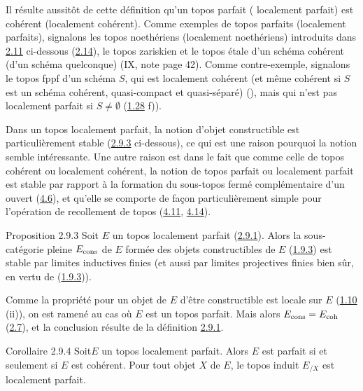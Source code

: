 \documentclass[10pt]{../fichiers-configuration-latex/smfart}
\begin{document}
Il résulte aussitôt de cette définition qu'un topos parfait (\resp
localement parfait) est cohérent (\resp localement cohérent). Comme
exemples de topos parfaits (\resp localement parfaits), signalons
les topos noethériens (\resp localement noethériens) introduits dans
\hyperref[VI.def2.11]{2.11} ci-dessous (\cf \hyperref[VI.subsec2.14]{2.14}), le topos
zariskien et le topos étale d'un schéma cohérent (\resp d'un schéma
quelconque) (IX, note page 42). Comme contre-exemple,\pageoriginale
signalons le topos fppf d'un schéma $S$, qui est localement cohérent
(et même cohérent si $S$ est un schéma cohérent, \ie quasi-compact
et quasi-séparé) (), mais qui n'est pas localement
parfait si $S \neq ∅$ (\hyperref[VI.exer1.28]{1.28} f)).

Dans un topos localement parfait, la notion d'objet constructible
est particulièrement stable (\hyperref[VI.prop2.9.3]{2.9.3} ci-dessous), ce qui
est une raison pourquoi la notion semble intéressante. Une autre
raison est dans le fait que comme celle de topos cohérent ou
localement cohérent, la notion de topos parfait ou localement
parfait est stable par rapport à la formation du sous-topos fermé
complémentaire d'un ouvert (\hyperref[VI.prop4.6]{4.6}), et qu'elle se
comporte de façon particulièrement simple pour l'opération de
recollement de topos (\hyperref[VI.cor4.11]{4.11}, \hyperref[VI.cor4.14]{4.14}).

\begin{enonce*}{Proposition 2.9.3}
Soit $E$ un topos localement parfait (\hyperref[VI.def2.9.1]{2.9.1}). Alors la
sous-catégorie
pleine $E_{\operatorname{cons}}$ de $E$ formée des objets constructibles de $E$
(\hyperref[VI.subsubsec1.9.3]{1.9.3}) est stable par limites inductives finies (et
aussi par limites
projectives finies bien sûr, en vertu de (\hyperref[VI.subsubsec1.9.3]{1.9.3})).
\end{enonce*}

Comme la propriété pour un objet de $E$ d'être constructible est
locale sur $E$ (\hyperref[VI.prop1.10]{1.10} (ii)), on est ramené au cas
où $E$ est un topos
parfait. Mais alors $E_{\operatorname{cons}} = E_{\mathrm{coh}}$ (\hyperref[VI.cor2.7]{2.7}), et la conclusion
résulte de la définition \hyperref[VI.def2.9.1]{2.9.1}.

\begin{enonce*}{Corollaire 2.9.4}
Soit\pageoriginale $E$ un topos localement parfait. Alors $E$ est parfait si et
seulement si $E$ est cohérent. Pour tout objet $X$ de $E$, le topos
induit $E_{/X}$ est localement parfait.
\end{enonce*}
\end{document}
